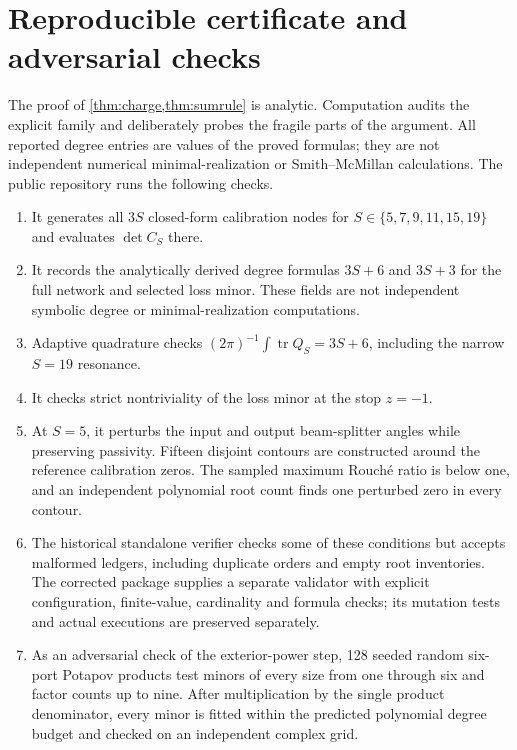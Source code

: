 \documentclass[11pt]{article}
\theoremstyle{definition}
\theoremstyle{remark}
\newcommand{\tr}{\operatorname{tr}}
\begin{document}
\section{Reproducible certificate and adversarial checks}

The proof of \cref{thm:charge,thm:sumrule} is analytic. Computation audits the
explicit family and deliberately probes the fragile parts of the argument.
All reported degree entries are values of the proved formulas; they are not
independent numerical minimal-realization or Smith--McMillan calculations.
The public repository \cite{ErikssonMemoryRepository2026} runs the following
checks.
\begin{enumerate}
 \item It generates all $3S$ closed-form calibration nodes for
 $S\in\{5,7,9,11,15,19\}$ and evaluates $\det C_S$ there.
 \item It records the analytically derived degree formulas $3S+6$ and
 $3S+3$ for the full network and selected loss minor. These fields are not
 independent symbolic degree or minimal-realization computations.
 \item Adaptive quadrature checks
 $(2\pi)^{-1}\int\tr Q_S=3S+6$, including the narrow $S=19$ resonance.
 \item It checks strict nontriviality of the loss minor at the stop $z=-1$.
 \item At $S=5$, it perturbs the input and output beam-splitter angles while
 preserving passivity.  Fifteen disjoint contours are constructed around the
 reference calibration zeros.  The sampled maximum Rouch\'e ratio is below
 one, and an independent polynomial root count finds one perturbed zero in
 every contour.
 \item The historical standalone verifier checks some of these conditions
 but accepts malformed ledgers, including duplicate orders and empty root
 inventories. The corrected package supplies a separate validator with
 explicit configuration, finite-value, cardinality and formula checks; its
 mutation tests and actual executions are preserved separately.
 \item As an adversarial check of the exterior-power step, 128 seeded random
 six-port Potapov products test minors of every size from one through six and
 factor counts up to nine.  After multiplication by the single product
 denominator, every minor is fitted within the predicted polynomial degree
 budget and checked on an independent complex grid.
\end{enumerate}
\end{document}
